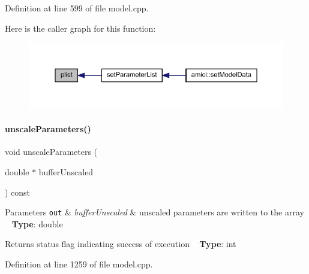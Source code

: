 Definition at line 599 of file model.\+cpp.

Here is the caller graph for this function\+:
\nopagebreak
\begin{figure}[H]
\begin{center}
\leavevmode
\includegraphics[width=350pt]{classamici_1_1_model_a6ac0de1b7dfddbb4a480657f62573563_icgraph}
\end{center}
\end{figure}
\mbox{\label{classamici_1_1_model_aa47922509b4e6ae5ff93e625f64b9785}} 
\paragraph{\texorpdfstring{unscale\+Parameters()}{unscaleParameters()}}
{\footnotesize\ttfamily void unscale\+Parameters (\begin{DoxyParamCaption}\item[{double $\ast$}]{buffer\+Unscaled }\end{DoxyParamCaption}) const}


\begin{DoxyParams}[1]{Parameters}
\mbox{\tt out}  & {\em buffer\+Unscaled} & unscaled parameters are written to the array ~\newline
{\bfseries Type}\+: double\\
\hline
\end{DoxyParams}
\begin{DoxyReturn}{Returns}
status flag indicating success of execution ~\newline
{\bfseries Type}\+: int 
\end{DoxyReturn}


Definition at line 1259 of file model.\+cpp.

